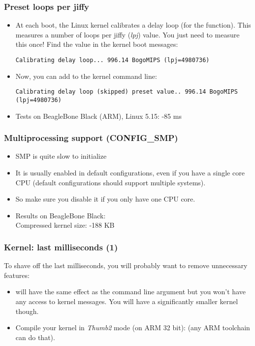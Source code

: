 \begin{frame}[fragile]
\frametitle{Preset loops per jiffy}
\begin{itemize}
        \item At each boot, the Linux kernel calibrates a delay loop (for
              the  function). This measures a number of loops per
              jiffy ({\em lpj}) value. You just need to measure this once! Find
              the  value in the kernel boot messages:
\begin{block}{}
\small
\begin{verbatim}
Calibrating delay loop... 996.14 BogoMIPS (lpj=4980736)
\end{verbatim}
\end{block}
        \item Now, you can add  to the kernel command
              line:
\begin{block}{}
\small
\begin{verbatim}
Calibrating delay loop (skipped) preset value.. 996.14 BogoMIPS (lpj=4980736)
\end{verbatim}
\end{block}
        \item Tests on BeagleBone Black (ARM), Linux 5.15: -85 ms
\end{itemize}
\end{frame}

\begin{frame}
  \frametitle{Multiprocessing support (CONFIG\_SMP)}
  \begin{itemize}
          \item SMP is quite slow to initialize
          \item It is usually enabled in default configurations, even if
                you have a single core CPU (default configurations
                should support multiple systems).
          \item So make sure you disable it if you only have one CPU
                core.
          \item Results on BeagleBone Black:\\
                Compressed kernel size: -188 KB
  \end{itemize}
\end{frame}


\begin{frame}
\frametitle{Kernel: last milliseconds (1)}
To shave off the last milliseconds, you will probably want to remove
unnecessary features:
\begin{itemize}
        \item {} will have the same effect as the
               command line argument but you won't have
	      any access to kernel messages. You will have a
              significantly smaller kernel though.
	\item Compile your kernel in {\em Thumb2} mode (on ARM 32 bit):
	       (any ARM toolchain can do
	      that).
\end{itemize}
\end{frame}


